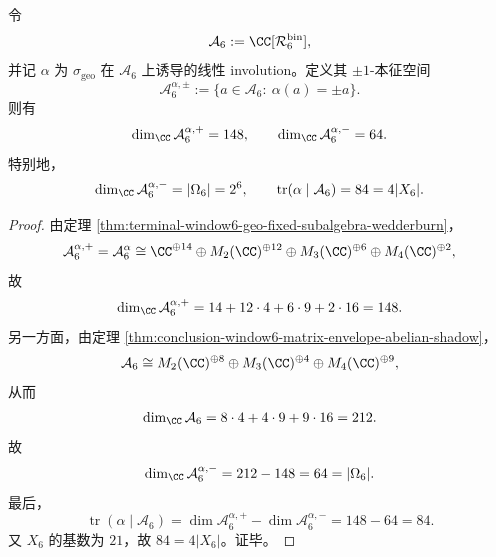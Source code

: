 \begin{theorem}\label{thm:conclusion-window6-groupoid-involution-lefschetz}
令
\[
\mathcal A_6:=\CC[\mathcal R_6^{\mathrm{bin}}],
\]
并记 \(\alpha\) 为 \(\sigma_{\mathrm{geo}}\) 在 \(\mathcal A_6\) 上诱导的线性 involution。定义其 \(\pm1\)-本征空间
\[
\mathcal A_6^{\alpha,\pm}:=\{a\in \mathcal A_6:\ \alpha(a)=\pm a\}.
\]
则有
\[
\dim_{\CC}\mathcal A_6^{\alpha,+}=148,
\qquad
\dim_{\CC}\mathcal A_6^{\alpha,-}=64.
\]
特别地，
\[
\dim_{\CC}\mathcal A_6^{\alpha,-}=|\Omega_6|=2^6,
\qquad
\operatorname{tr}(\alpha\mid \mathcal A_6)=84=4|X_6|.
\]
\end{theorem}
\begin{proof}
由定理 \ref{thm:terminal-window6-geo-fixed-subalgebra-wedderburn}，
\[
\mathcal A_6^{\alpha,+}
=
\mathcal A_6^\alpha
\cong
\CC^{\oplus 14}\oplus M_2(\CC)^{\oplus 12}\oplus M_3(\CC)^{\oplus 6}\oplus M_4(\CC)^{\oplus 2},
\]
故
\[
\dim_{\CC}\mathcal A_6^{\alpha,+}
=
14+12\cdot 4+6\cdot 9+2\cdot 16
=
148.
\]
另一方面，由定理 \ref{thm:conclusion-window6-matrix-envelope-abelian-shadow}，
\[
\mathcal A_6
\cong
M_2(\CC)^{\oplus 8}\oplus M_3(\CC)^{\oplus 4}\oplus M_4(\CC)^{\oplus 9},
\]
从而
\[
\dim_{\CC}\mathcal A_6
=
8\cdot 4+4\cdot 9+9\cdot 16
=
212.
\]
故
\[
\dim_{\CC}\mathcal A_6^{\alpha,-}
=
212-148
=
64
=
|\Omega_6|.
\]
最后，
\[
\operatorname{tr}(\alpha\mid \mathcal A_6)
=
\dim \mathcal A_6^{\alpha,+}-\dim \mathcal A_6^{\alpha,-}
=
148-64
=
84.
\]
又 \(X_6\) 的基数为 \(21\)，故 \(84=4|X_6|\)。证毕。
\end{proof}

